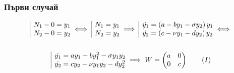 \documentclass[a4paper,fleqn,12pt]{article}
\begin{document}
\subsubsection{Първи случай}
\begin{gather*}
	\begin{array}{|l@{}}
		 N_1 - 0 = y_1\\
		 N_2 - 0 = y_2
	\end{array} \iff 
	\begin{array}{|l@{}}
		 N_1 = y_1\\
		 N_2 = y_2
	\end{array} \implies
	\begin{array}{|l@{}}
		\dot{y_1} = \left(a - by_1 - \sigma y_2 \right) y_1\\
		\dot{y_2} = \left(c - \nu y_1 - d y_2 \right) y_2 
	\end{array} \iff \\ \\
	\begin{array}{|l@{}}
		\dot{y_1} = ay_1 - by_1 ^2- \sigma y_1 y_2 \\
		\dot{y_2} = cy_2 - \nu y_1y_2 - d y_2 ^2 
	\end{array} 
\implies  W = \begin{pmatrix} a&0\\0&c \end{pmatrix} \tag{$I$}
\end{gather*}
\end{document}
